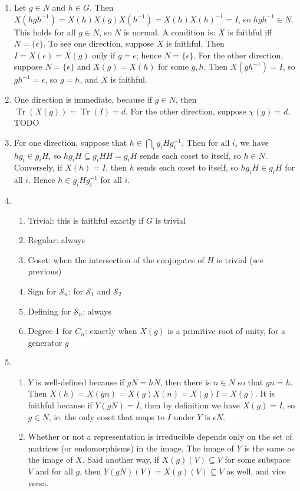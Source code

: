 \documentclass{amsart}
\DeclareMathOperator{\Tr}{Tr}
\renewcommand{\S}{\mathcal{S}}
\begin{document}
\begin{enumerate}
\begin{enumerate}
        \item Let $g \in N$ and $h \in G$.  Then $X(hgh^{-1}) = X(h)X(g)X(h^{-1}) = X(h)X(h)^{-1} = I$, so $hgh^{-1} \in N$.  This holds for all $g \in N$, so $N$ is normal.  A condition is: $X$ is faithful iff $N = \{\epsilon\}$.  To see one direction, suppose $X$ is faithful.  Then $I = X(\epsilon) = X(g)$ only if $g = \epsilon$; hence $N = \{\epsilon\}$.  For the other direction, suppose $N = \{\epsilon\}$ and $X(g) = X(h)$ for some $g,h$.  Then $X(gh^{-1}) = I$, so $gh^{-1} = \epsilon$, so $g=h$, and $X$ is faithful.
        \item One direction is immediate, because if $g \in N$, then $\Tr(X(g)) = \Tr(I) = d$.  For the other direction, suppose $\chi(g) = d$.  TODO
        \item For one direction, suppose that $h \in \bigcap_i g_iHg_i^{-1}$.  Then for all $i$, we have $hg_i \in g_iH$, so $hg_iH \subseteq g_iHH = g_iH$ sends each coset to itself, so $h \in N$.  Conversely, if $X(h) = I$, then $h$ sends each coset to itself, so $hg_iH \in g_iH$ for all $i$.  Hence $h \in g_iHg_i^{-1}$ for all $i$.
        \item
        \begin{enumerate}
        \item Trivial: this is faithful exactly if $G$ is trivial
        \item Regular: always
        \item Coset: when the intersection of the conjugates of $H$ is trivial (see previous)
        \item Sign for $\S_n$: for $\S_1$ and $\S_2$
        \item Defining for $\S_n$: always
        \item Degree 1 for $C_n$: exactly when $X(g)$ is a primitive root of unity, for a generator $g$
        \end{enumerate}
        \item 
          \begin{enumerate}
              \item $Y$ is well-defined because if $gN = hN$, then there is $n \in N$ so that $gn = h$.  Then $X(h) = X(gn) = X(g)X(n) = X(g)I = X(g)$.  It is faithful because if $Y(gN) = I$, then by definition we have $X(g) = I$, so $g \in N$, ie. the only coset that maps to $I$ under $Y$ is $\epsilon N$.
              \item Whether or not a representation is irreducible depends only on the set of matrices (or endomorphisms) in the image.  The image of $Y$ is the same as the image of $X$.  Said another way, if $X(g)(V) \subseteq V$ for some subspace $V$ and for all $g$, then $Y(gN)(V) = X(g)(V) \subseteq V$ as well, and vice versa.

\end{enumerate}
\end{enumerate}
\end{enumerate}
\end{document}
